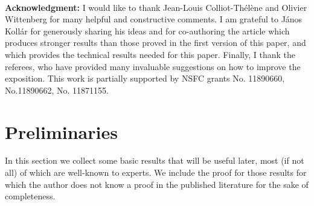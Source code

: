 \documentclass{amsart}
\theoremstyle{definition}
\theoremstyle{remark}
\begin{document}
\\

\textbf{Acknowledgment:} I would like to thank Jean-Louis Colliot-Th\'el\`ene and Olivier Wittenberg for many helpful and constructive comments. 
I am grateful to J\'anos Koll\'ar for generously sharing his ideas and for co-authoring the article \cite{Kollar_Tian} which produces stronger results than those proved in the first version of this paper, 
and which provides the technical results needed for this paper. 
Finally, I thank the referees, who have provided many invaluable suggestions on how to improve the exposition. 
This work is partially supported by NSFC grants No. 11890660, No.11890662, No. 11871155.

\section{Preliminaries}\label{sec:pre}
In this section we collect some basic results that will be useful later, most (if not all) of which are well-known to experts. 
We include the proof for those results for which the author does not know a proof in the published literature for the sake of completeness.
\end{document}
